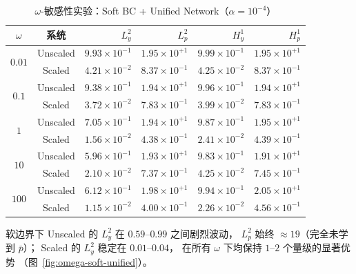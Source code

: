 \begin{table}[H]
  \centering
  \caption{$\omega$-敏感性实验：Soft BC + Unified Network（$\alpha=10^{-4}$）}
  \label{tab:omega-soft-unified}
  \small
  \begin{tabular}{cc rrrr}
    \toprule
    $\omega$ & 系统 & $L^2_y$ & $L^2_p$ & $H^1_y$ & $H^1_p$ \\
    \midrule
    \multirow{2}{*}{$0.01$}
      & Unscaled & $9.93\times10^{-1}$ & $1.95\times10^{+1}$
                 & $9.99\times10^{-1}$ & $1.95\times10^{+1}$ \\
      & Scaled   & $4.21\times10^{-2}$ & $8.37\times10^{-1}$
                 & $4.25\times10^{-2}$ & $8.37\times10^{-1}$ \\
    \midrule
    \multirow{2}{*}{$0.1$}
      & Unscaled & $9.38\times10^{-1}$ & $1.94\times10^{+1}$
                 & $9.96\times10^{-1}$ & $1.94\times10^{+1}$ \\
      & Scaled   & $3.72\times10^{-2}$ & $7.83\times10^{-1}$
                 & $3.99\times10^{-2}$ & $7.83\times10^{-1}$ \\
    \midrule
    \multirow{2}{*}{$1$}
      & Unscaled & $7.05\times10^{-1}$ & $1.94\times10^{+1}$
                 & $9.87\times10^{-1}$ & $1.95\times10^{+1}$ \\
      & Scaled   & $1.56\times10^{-2}$ & $4.38\times10^{-1}$
                 & $2.41\times10^{-2}$ & $4.39\times10^{-1}$ \\
    \midrule
    \multirow{2}{*}{$10$}
      & Unscaled & $5.96\times10^{-1}$ & $1.93\times10^{+1}$
                 & $9.83\times10^{-1}$ & $1.91\times10^{+1}$ \\
      & Scaled   & $2.10\times10^{-2}$ & $7.37\times10^{-1}$
                 & $4.25\times10^{-2}$ & $7.45\times10^{-1}$ \\
    \midrule
    \multirow{2}{*}{$100$}
      & Unscaled & $6.12\times10^{-1}$ & $1.98\times10^{+1}$
                 & $9.94\times10^{-1}$ & $2.05\times10^{+1}$ \\
      & Scaled   & $1.15\times10^{-2}$ & $4.00\times10^{-1}$
                 & $2.26\times10^{-2}$ & $4.56\times10^{-1}$ \\
    \bottomrule
  \end{tabular}
\end{table}

软边界下 Unscaled 的 $L^2_y$ 在 $0.59$--$0.99$ 之间剧烈波动，
$L^2_p$ 始终 $\approx 19$（完全未学到 $\bar{p}$）；
Scaled 的 $L^2_y$ 稳定在 $0.01$--$0.04$，
在所有 $\omega$ 下均保持 $1$--$2$ 个量级的显著优势
（图~\ref{fig:omega-soft-unified}）。

